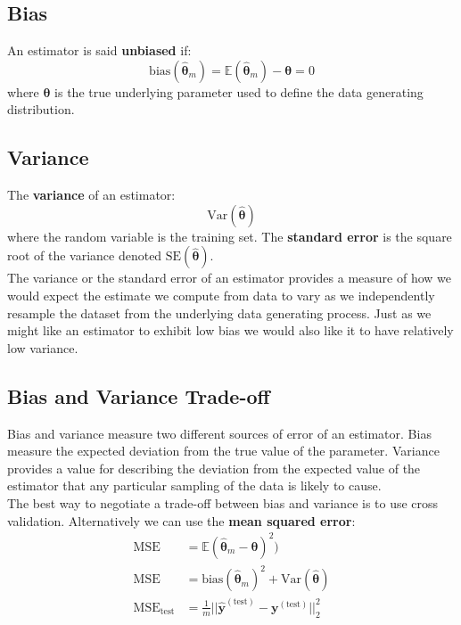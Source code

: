 \documentclass[12pt]{report}
\begin{document}
        \subsection{Bias}
            An estimator is said \textbf{unbiased} if:
            \begin{equation}
                \text{bias}(\hat{\boldsymbol{\theta}}_m) = \mathbb{E}(\hat{\boldsymbol{\theta}}_m) - \boldsymbol{\theta} = 0
            \end{equation}
            where $\boldsymbol{\theta}$ is the true underlying parameter used to define the data generating distribution.
        \subsection{Variance}
            The \textbf{variance} of an estimator:
            \begin{equation}
                \text{Var}(\hat{\boldsymbol{\theta}})
            \end{equation} 
            where the random variable is the training set.
            The \textbf{standard error} is the square root of the variance denoted $\text{SE}(\hat{\boldsymbol{\theta}})$.\\
            
            The variance or the standard error of an estimator provides a measure of how we would expect the estimate we compute from data to vary as we independently resample the dataset from the underlying data generating process. Just as we might like an estimator to exhibit low bias we would also like it to have relatively low variance.
        
        \subsection{Bias and Variance Trade-off}    
            Bias and variance measure two different sources of error of an estimator. Bias measure the expected deviation from the true value of the parameter. Variance provides a value for describing the deviation from the expected value of the estimator that any particular sampling of the data is likely to cause.\\
            
            The best way to negotiate a trade-off between bias and variance is to use cross validation. Alternatively we can use the \textbf{mean squared error}:
            \begin{align}
             \text{MSE} &= \mathbb{E}(\hat{\boldsymbol{\theta}}_m -      \boldsymbol{\theta})^2) \\
             \text{MSE} &= \text{bias}(\hat{\boldsymbol{\theta}}_m)^2 + \text{Var}(\hat{\boldsymbol{\theta}}) \\
             \text{MSE}_{\text{test}} &= \frac{1}{m}||\boldsymbol{\hat{y}}^{(\text{test})} - \boldsymbol{y}^{(\text{test})} ||_2^2
            \end{align}
\end{document}
